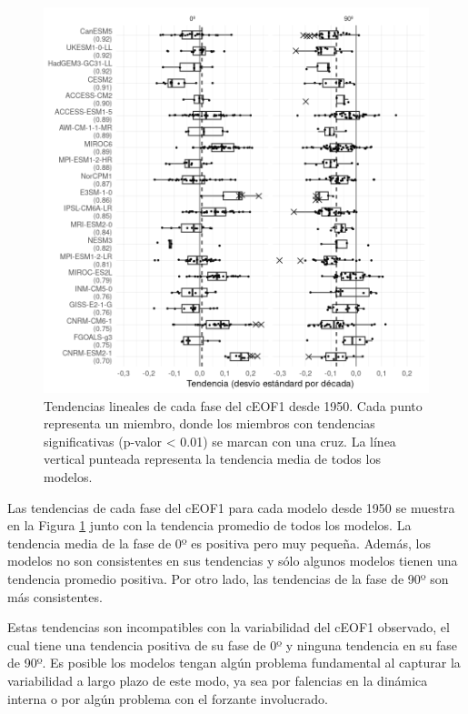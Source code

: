 \documentclass[12pt,oneside,a4paper]{reedthesis}
\begin{document}
\begin{figure}

{\centering \includegraphics{figures/50-cmip6/trends-ceof1-1} 

}

\caption{Tendencias lineales de cada fase del cEOF1 desde 1950. Cada punto representa un miembro, donde los miembros con tendencias significativas (p-valor \textless{} 0.01) se marcan con una cruz. La línea vertical punteada representa la tendencia media de todos los modelos.}\label{fig:trends-ceof1}
\end{figure}



Las tendencias de cada fase del cEOF1 para cada modelo desde 1950 se muestra en la Figura \ref{fig:trends-ceof1} junto con la tendencia promedio de todos los modelos.
La tendencia media de la fase de 0º es positiva pero muy pequeña.
Además, los modelos no son consistentes en sus tendencias y sólo algunos modelos tienen una tendencia promedio positiva.
Por otro lado, las tendencias de la fase de 90º son más consistentes.

Estas tendencias son incompatibles con la variabilidad del cEOF1 observado, el cual tiene una tendencia positiva de su fase de 0º y ninguna tendencia en su fase de 90º.
Es posible los modelos tengan algún problema fundamental al capturar la variabilidad a largo plazo de este modo, ya sea por falencias en la dinámica interna o por algún problema con el forzante involucrado.
\end{document}
